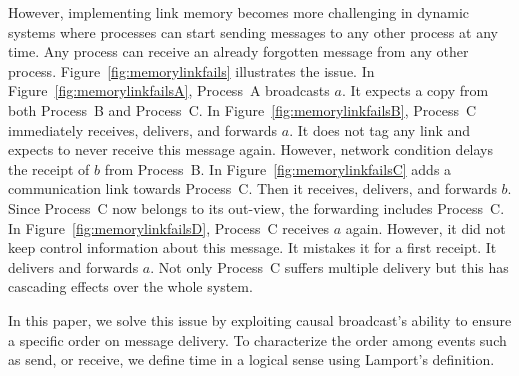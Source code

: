 However, implementing link memory becomes more challenging in dynamic systems
where processes can start sending messages to any other process at any time. Any
process can receive an already forgotten message from any other
process. Figure~\ref{fig:memorylinkfails} illustrates the issue. In
Figure~\ref{fig:memorylinkfailsA}, Process~A broadcasts $a$. It expects a copy
from both Process~B and Process~C. In Figure~\ref{fig:memorylinkfailsB},
Process~C immediately receives, delivers, and forwards $a$. It does not tag any
link and expects to never receive this message again. However, network condition
delays the receipt of $b$ from Process~B. In Figure~\ref{fig:memorylinkfailsC}
adds a communication link towards Process~C. Then it receives, delivers, and
forwards $b$. Since Process~C now belongs to its out-view, the forwarding
includes Process~C. In Figure~\ref{fig:memorylinkfailsD}, Process~C receives $a$
again. However, it did not keep control information about this message. It
mistakes it for a first receipt. It delivers and forwards $a$. Not only
Process~C suffers multiple delivery but this has cascading effects over the
whole system.

In this paper, we solve this issue by exploiting causal broadcast's ability to
ensure a specific order on message delivery. To characterize the order among
events such as send, or receive, we define time in a logical sense using
Lamport’s definition.






